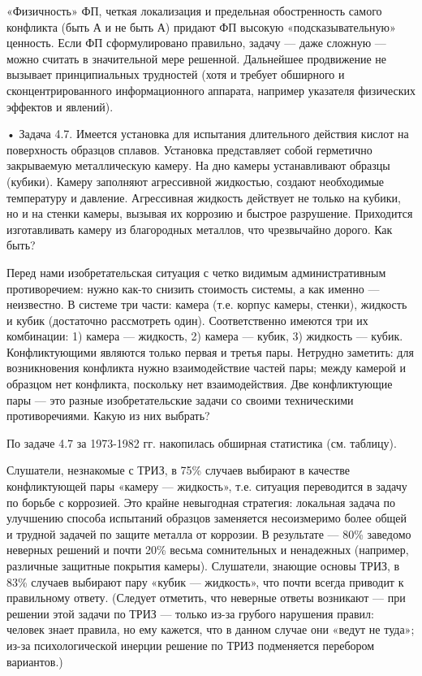 «Физичность» ФП, четкая локализация  и предельная обостренность самого
конфликта (быть А и не  быть А) придают ФП высокую «подсказывательную»
ценность. Если  ФП сформулировано правильно,  задачу — даже  сложную —
можно  считать в  значительной мере  решенной. Дальнейшее  продвижение
не  вызывает  принципиальных  трудностей  (хотя  и  требует  обширного
и  сконцентрированного  информационного аппарата,  например  указателя
физических эффектов и явлений).

•  Задача 4.7.  Имеется установка  для испытания  длительного действия
кислот  на   поверхность  образцов  сплавов.   Установка  представляет
собой  герметично  закрываемую  металлическую камеру.  На  дно  камеры
устанавливают   образцы   (кубики).   Камеру   заполняют   агрессивной
жидкостью,  создают необходимые  температуру  и давление.  Агрессивная
жидкость действует не только на кубики, но и на стенки камеры, вызывая
их коррозию  и быстрое разрушение. Приходится  изготавливать камеру из
благородных металлов, что чрезвычайно дорого. Как быть?

Перед нами изобретательская ситуация  с четко видимым административным
противоречием: нужно как-то снизить стоимость  системы, а как именно —
неизвестно. В системе три части:  камера (т.е. корпус камеры, стенки),
жидкость и кубик (достаточно рассмотреть один). Соответственно имеются
три  их комбинации:  1)  камера  — жидкость,  2)  камера  — кубик,  3)
жидкость — кубик. Конфликтующими являются только первая и третья пары.
Нетрудно  заметить: для  возникновения конфликта  нужно взаимодействие
частей пары;  между камерой  и образцом  нет конфликта,  поскольку нет
взаимодействия. Две  конфликтующие пары — это  разные изобретательские
задачи со своими техническими противоречиями. Какую из них выбрать?

По задаче  4.7 за  1973-1982 гг.  накопилась обширная  статистика (см.
таблицу).


Слушатели,  незнакомые  с ТРИЗ,  в  75\%  случаев выбирают  в  качестве
конфликтующей пары  «камеру —  жидкость», т.е. ситуация  переводится в
задачу  по  борьбе  с  коррозией.  Это  крайне  невыгодная  стратегия:
локальная задача  по улучшению  способа испытаний  образцов заменяется
несоизмеримо  более  общей и  трудной  задачей  по защите  металла  от
коррозии.  В  результате  —  80\% заведомо  неверных  решений  и  почти
20\%  весьма сомнительных  и ненадежных  (например, различные  защитные
покрытия  камеры).  Слушатели,  знающие  основы ТРИЗ,  в  83\%  случаев
выбирают  пару  «кубик  —  жидкость»,  что  почти  всегда  приводит  к
правильному ответу. (Следует отметить, что неверные ответы возникают —
при  решении этой  задачи по  ТРИЗ  — только  из-за грубого  нарушения
правил: человек знает правила, но ему кажется, что в данном случае они
«ведут  не  туда»;  из-за  психологической  инерции  решение  по  ТРИЗ
подменяется перебором вариантов.)

